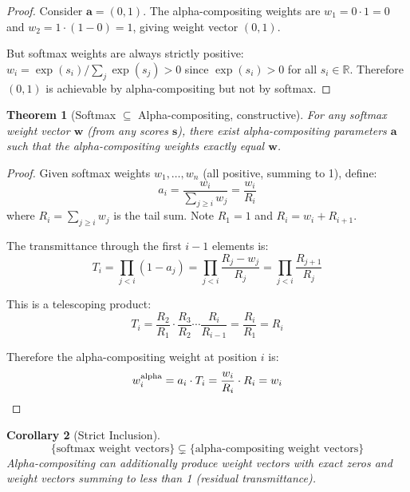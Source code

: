 \documentclass[11pt]{article}
\newtheorem{theorem}{Theorem}
\newtheorem{corollary}[theorem]{Corollary}
\begin{document}
\begin{proof}
Consider $\mathbf{a} = (0, 1)$. The alpha-compositing weights are $w_1 = 0 \cdot 1 = 0$ and $w_2 = 1 \cdot (1 - 0) = 1$, giving weight vector $(0, 1)$.

But softmax weights are always strictly positive: $w_i = \exp(s_i)/\sum_j\exp(s_j) > 0$ since $\exp(s_i) > 0$ for all $s_i \in \mathbb{R}$. Therefore $(0,1)$ is achievable by alpha-compositing but not by softmax.
\end{proof}

\begin{theorem}[Softmax $\subseteq$ Alpha-compositing, constructive]
\label{thm:softmax-subset}
For any softmax weight vector $\mathbf{w}$ (from any scores $\mathbf{s}$), there exist alpha-compositing parameters $\mathbf{a}$ such that the alpha-compositing weights exactly equal $\mathbf{w}$.
\end{theorem}

\begin{proof}
Given softmax weights $w_1, \ldots, w_n$ (all positive, summing to 1), define:
\begin{equation}
a_i = \frac{w_i}{\sum_{j \geq i} w_j} = \frac{w_i}{R_i}
\end{equation}
where $R_i = \sum_{j \geq i} w_j$ is the tail sum. Note $R_1 = 1$ and $R_i = w_i + R_{i+1}$.

The transmittance through the first $i-1$ elements is:
\begin{equation}
T_i = \prod_{j < i}(1 - a_j) = \prod_{j < i}\frac{R_j - w_j}{R_j} = \prod_{j < i}\frac{R_{j+1}}{R_j}
\end{equation}

This is a telescoping product:
\begin{equation}
T_i = \frac{R_2}{R_1} \cdot \frac{R_3}{R_2} \cdots \frac{R_i}{R_{i-1}} = \frac{R_i}{R_1} = R_i
\end{equation}

Therefore the alpha-compositing weight at position $i$ is:
\begin{equation}
w_i^{\text{alpha}} = a_i \cdot T_i = \frac{w_i}{R_i} \cdot R_i = w_i \qedhere
\end{equation}
\end{proof}

\begin{corollary}[Strict Inclusion]
\begin{equation}
\{\text{softmax weight vectors}\} \subsetneq \{\text{alpha-compositing weight vectors}\}
\end{equation}
Alpha-compositing can additionally produce weight vectors with exact zeros and weight vectors summing to less than 1 (residual transmittance).
\end{corollary}
\end{document}
